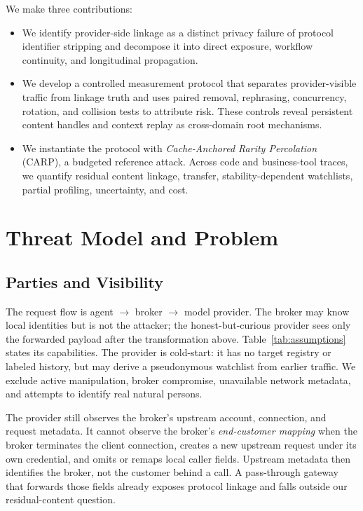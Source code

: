 \documentclass[letterpaper]{article}
\begin{document}
We make three contributions:
\begin{itemize}
    \item We identify provider-side linkage as a distinct privacy failure of protocol identifier
    stripping and decompose it into direct exposure, workflow continuity, and longitudinal propagation.
    \item We develop a controlled measurement protocol that separates provider-visible traffic from
    linkage truth and uses paired removal, rephrasing, concurrency, rotation, and collision tests to
    attribute risk. These controls reveal persistent content handles and context replay as cross-domain
    root mechanisms.
    \item We instantiate the protocol with \emph{Cache-Anchored Rarity Percolation} (\textsc{CARP}),
    a budgeted reference attack. Across code and business-tool traces, we quantify residual content
    linkage, transfer, stability-dependent watchlists, partial profiling, uncertainty, and cost.
\end{itemize}

\section{Threat Model and Problem}

\subsection{Parties and Visibility}

The request flow is agent $\rightarrow$ broker $\rightarrow$ model provider. The broker may know
local identities but is not the attacker; the honest-but-curious provider sees only the forwarded
payload after the transformation above. Table~\ref{tab:assumptions} states its capabilities. The
provider is cold-start: it has no target registry or labeled history, but may derive a pseudonymous
watchlist from earlier traffic. We exclude active manipulation, broker compromise, unavailable
network metadata, and attempts to identify real natural persons.

The provider still observes the broker's upstream account, connection, and request metadata. It
cannot observe the broker's \emph{end-customer mapping} when the broker terminates the client
connection, creates a new upstream request under its own credential, and omits or remaps local
caller fields. Upstream metadata then identifies the broker, not the customer behind a call. A
pass-through gateway that forwards those fields already exposes protocol linkage and falls outside
our residual-content question.
\end{document}
